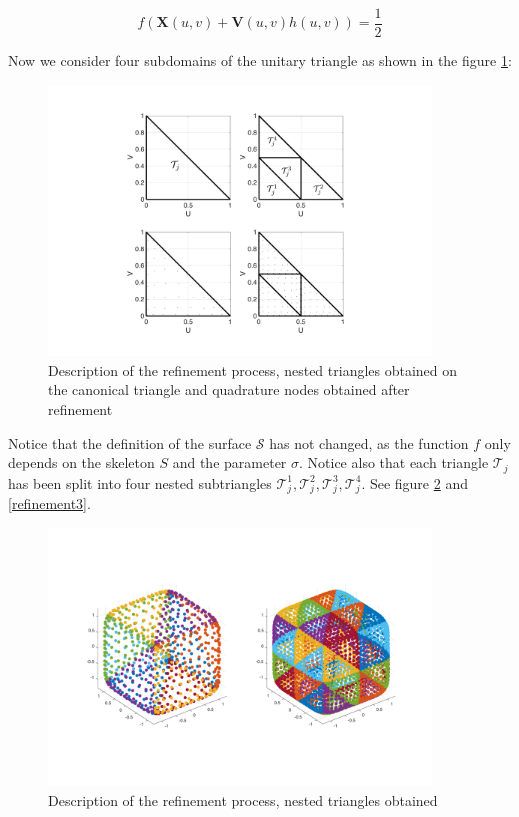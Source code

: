 \documentclass[11pt]{article}
\numberwithin{equation}{section}
\newcommand\bX{\boldsymbol X}
\newcommand\bV{\boldsymbol V}
\begin{document}
\begin{equation}
f(\bX(u,v)+\bV(u,v)h(u,v))=\frac{1}{2}
\end{equation}

Now we consider four subdomains of the unitary triangle as shown in the figure \ref{refinement1}:

\begin{figure}[H]
\begin{center}
\includegraphics[width=4in]{Triangle_Refine_v2.pdf}
\end{center}
\caption{Description of the refinement process, nested triangles obtained on the canonical triangle and quadrature nodes obtained after refinement}
\label{refinement1}
\end{figure}

Notice that the definition of the surface $\mathcal{S}$ has not changed, as the function $f$ only depends on the skeleton $\mathit{S}$ and the parameter $\sigma$. Notice also that each triangle $\mathcal{T}_j$ has been split into four nested subtriangles $\mathcal{T}_j^1,\mathcal{T}_j^2,\mathcal{T}_j^3,\mathcal{T}_j^4$. See figure \ref{refinement2} and \ref{refinement3}.

\begin{figure}[H]
\begin{center}
\includegraphics[width=4in]{cloud_points_refinement_v2.pdf}%
\end{center}
\caption{Description of the refinement process, nested triangles obtained}
\label{refinement2}
\end{figure}
\end{document}
